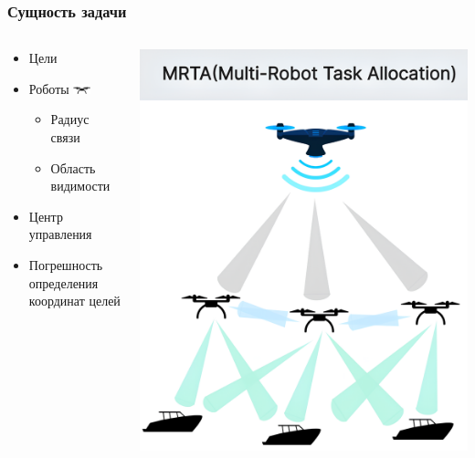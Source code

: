 \documentclass{beamer}
\begin{document}
	\begin{frame}
	    \frametitle{Сущность задачи}
	    \begin{columns}[T]
	        \begin{column}{0.5\textwidth}
	            \begin{itemize}
	                \item Цели   
	                \item Роботы {\includegraphics[width=0.5cm]{2.jpg}}  
	                \begin{itemize}
	                    \item Радиус связи
	                    \item Область видимости
	                \end{itemize}
	                \item Центр управления   
	                \item Погрешность определения координат целей
	            \end{itemize}
	        \end{column}
	        \begin{column}{0.6\textwidth}
	            \centering
		 \hspace*{-1.5cm} %
	            \includegraphics[width=\textwidth,height=0.85\textheight,keepaspectratio]{mrta1.png}

\end{column}
\end{columns}
\end{frame}
\end{document}
